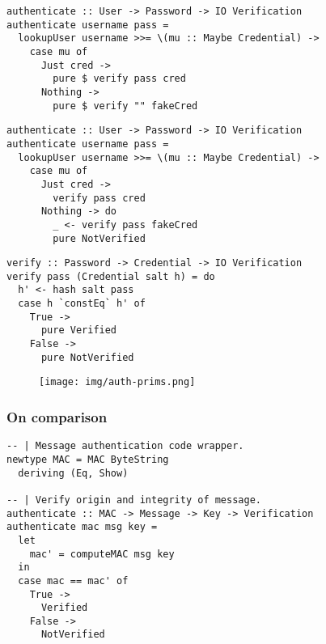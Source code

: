 \documentclass{beamer}
\begin{document}
\begin{frame}[fragile]

\begin{verbatim}
authenticate :: User -> Password -> IO Verification
authenticate username pass =
  lookupUser username >>= \(mu :: Maybe Credential) ->
    case mu of
      Just cred ->
        pure $ verify pass cred
      Nothing ->
        pure $ verify "" fakeCred
\end{verbatim}

\end{frame}

\begin{frame}[fragile]

\begin{verbatim}
authenticate :: User -> Password -> IO Verification
authenticate username pass =
  lookupUser username >>= \(mu :: Maybe Credential) ->
    case mu of
      Just cred ->
        verify pass cred
      Nothing -> do
        _ <- verify pass fakeCred
        pure NotVerified
\end{verbatim}

\end{frame}

\begin{frame}[fragile]

\begin{verbatim}
verify :: Password -> Credential -> IO Verification
verify pass (Credential salt h) = do
  h' <- hash salt pass
  case h `constEq` h' of
    True ->
      pure Verified
    False ->
      pure NotVerified
\end{verbatim}

\end{frame}


\begin{frame}

\begin{figure}
  \texttt{[image: img/auth-prims.png]}
\end{figure}
\end{frame}



\begin{frame}[fragile]

\frametitle{On comparison}

\begin{verbatim}
-- | Message authentication code wrapper.
newtype MAC = MAC ByteString
  deriving (Eq, Show)

-- | Verify origin and integrity of message.
authenticate :: MAC -> Message -> Key -> Verification
authenticate mac msg key =
  let
    mac' = computeMAC msg key
  in
  case mac == mac' of
    True ->
      Verified
    False ->
      NotVerified
\end{verbatim}

\end{frame}
\end{document}
